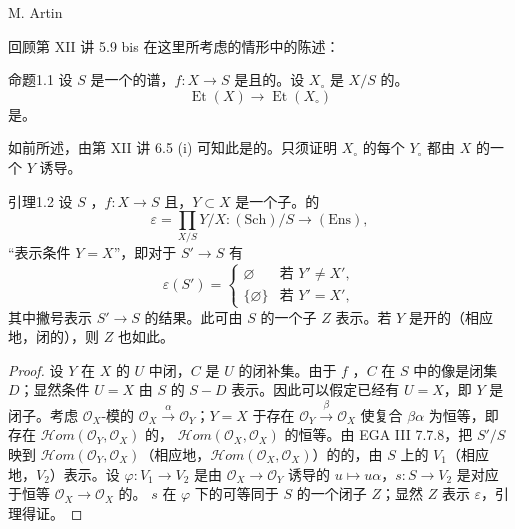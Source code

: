 \begin{center}M. Artin\end{center}
回顾第 XII 讲 5.9 bis 在这里所考虑的情形中的陈述：
\begin{SGAresult}{命题}{1.1}
设 $S$ 是一个的谱，$f:X\to S$ 是且的。设 $X_\circ$ 是 $X/S$ 的。
\[
\operatorname{Et}(X)\longrightarrow\operatorname{Et}(X_\circ)
\]
是。
\end{SGAresult}
如前所述，由第 XII 讲 6.5 (i) 可知此是的。只须证明 $X_\circ$ 的每个 $Y_\circ$ 都由 $X$ 的一个 $Y$ 诱导。
\begin{SGAresult}{引理}{1.2}
设 $S$ ，$f:X\to S$ 且，$Y\subset X$ 是一个子。的
\[
\varepsilon=\prod_{X/S}Y/X:(\mathrm{Sch})/S\longrightarrow(\mathrm{Ens}),
\]
“表示条件 $Y=X$”，即对于 $S'\to S$ 有
\[
\varepsilon(S')=\begin{cases}
\varnothing&\text{若 }Y'\ne X',\\
\{\varnothing\}&\text{若 }Y'=X',
\end{cases}
\]
其中撇号表示 $S'\to S$ 的结果。此可由 $S$ 的一个子 $Z$ 表示。若 $Y$ 是开的（相应地，闭的），则 $Z$ 也如此。
\end{SGAresult}
\begin{proof}
设 $Y$ 在 $X$ 的 $U$ 中闭，$C$ 是 $U$ 的闭补集。由于 $f$ ，$C$ 在 $S$ 中的像是闭集 $D$；显然条件 $U=X$ 由 $S$ 的 $S-D$ 表示。因此可以假定已经有 $U=X$，即 $Y$ 是闭子。考虑 $\mathcal O_X$-模的 $\mathcal O_X\xrightarrow{\alpha}\mathcal O_Y$；$Y=X$ 于存在 $\mathcal O_Y\xrightarrow{\beta}\mathcal O_X$ 使复合 $\beta\alpha$ 为恒等，即存在 $\mathcal H om(\mathcal O_Y,\mathcal O_X)$ 的， $\mathcal H om(\mathcal O_X,\mathcal O_X)$ 的恒等。由 EGA III 7.7.8，把 $S'/S$ 映到 $\mathcal H om(\mathcal O_Y,\mathcal O_X)$（相应地，$\mathcal H om(\mathcal O_X,\mathcal O_X)$）的的，由 $S$ 上的 $V_1$（相应地，$V_2$）表示。设 $\varphi:V_1\to V_2$ 是由 $\mathcal O_X\to\mathcal O_Y$ 诱导的 $u\mapsto u\alpha$，$s:S\to V_2$ 是对应于恒等 $\mathcal O_X\to\mathcal O_X$ 的。 $s$ 在 $\varphi$ 下的可等同于 $S$ 的一个闭子 $Z$；显然 $Z$ 表示 $\varepsilon$，引理得证。
\end{proof}
